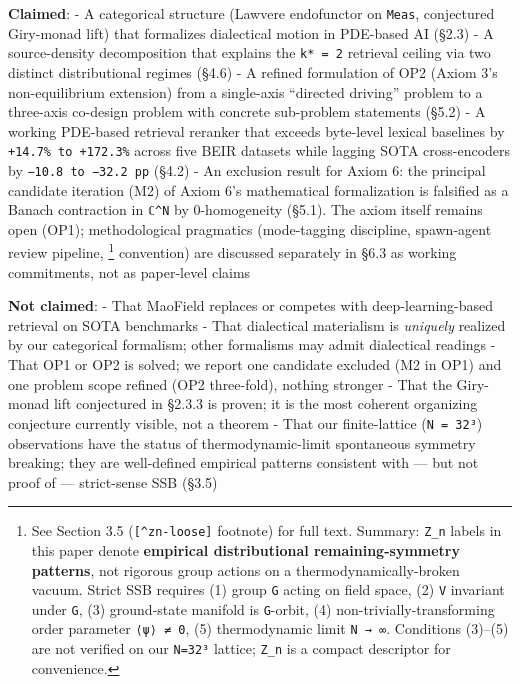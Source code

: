 \documentclass[
]{article}
\begin{document}
\textbf{Claimed}: - A categorical structure (Lawvere endofunctor on
\texttt{Meas}, conjectured Giry-monad lift) that formalizes dialectical
motion in PDE-based AI (§2.3) - A source-density decomposition that
explains the \texttt{k*\ =\ 2} retrieval ceiling via two distinct
distributional regimes (§4.6) - A refined formulation of OP2 (Axiom 3's
non-equilibrium extension) from a single-axis ``directed driving''
problem to a three-axis co-design problem with concrete sub-problem
statements (§5.2) - A working PDE-based retrieval reranker that exceeds
byte-level lexical baselines by \texttt{+14.7\%\ to\ +172.3\%} across
five BEIR datasets while lagging SOTA cross-encoders by
\texttt{−10.8\ to\ −32.2\ pp} (§4.2) - An exclusion result for Axiom 6:
the principal candidate iteration (M2) of Axiom 6's mathematical
formalization is falsified as a Banach contraction in \texttt{ℂ\^{}N} by
0-homogeneity (§5.1). The axiom itself remains open (OP1);
methodological pragmatics (mode-tagging discipline, spawn-agent review
pipeline, \footnote{See Section 3.5 (\texttt{{[}\^{}zn-loose{]}}
  footnote) for full text. Summary: \texttt{Z\_n} labels in this paper
  denote \textbf{empirical distributional remaining-symmetry patterns},
  not rigorous group actions on a thermodynamically-broken vacuum.
  Strict SSB requires (1) group \texttt{G} acting on field space, (2)
  \texttt{V} invariant under \texttt{G}, (3) ground-state manifold is
  \texttt{G}-orbit, (4) non-trivially-transforming order parameter
  \texttt{⟨ψ⟩\ ≠\ 0}, (5) thermodynamic limit \texttt{N\ →\ ∞}.
  Conditions (3)--(5) are not verified on our \texttt{N=32³} lattice;
  \texttt{Z\_n} is a compact descriptor for convenience.} convention)
are discussed separately in §6.3 as working commitments, not as
paper-level claims

\textbf{Not claimed}: - That MaoField replaces or competes with
deep-learning-based retrieval on SOTA benchmarks - That dialectical
materialism is \emph{uniquely} realized by our categorical formalism;
other formalisms may admit dialectical readings - That OP1 or OP2 is
solved; we report one candidate excluded (M2 in OP1) and one problem
scope refined (OP2 three-fold), nothing stronger - That the Giry-monad
lift conjectured in §2.3.3 is proven; it is the most coherent organizing
conjecture currently visible, not a theorem - That our finite-lattice
(\texttt{N\ =\ 32³}) observations have the status of thermodynamic-limit
spontaneous symmetry breaking; they are well-defined empirical patterns
consistent with --- but not proof of --- strict-sense SSB (§3.5)
\end{document}
